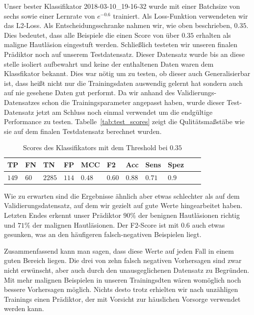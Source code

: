 Unser bester Klassifikator 2018-03-10\_19-16-32 wurde mit einer Batchsize von sechs sowie einer Lernrate von $e^{-0.6}$ trainiert. Als Loss-Funktion verwendeten wir das L2-Loss. Als Entscheidungsschranke nahmen wir, wie oben beschrieben, $0.35$. Dies bedeutet, dass alle Beispiele die einen Score von über $0.35$ erhalten als maligne Hautläsion eingestuft werden. Schließlich testeten wir unseren finalen Prädiktor noch auf unserem Testdatensatz. Dieser Datensatz wurde bis an diese stelle isoliert aufbewahrt und keine der enthaltenen Daten waren dem Klassfikator bekannt. Dies war nötig um zu testen, ob dieser auch Generalisierbar ist, dass heißt nicht nur die Trainingsdaten auswendig gelernt hat sondern auch auf nie gesehene Daten gut performt. Da wir anhand des Validierungs-Datensatzes schon die Trainingsparameter angepasst haben, wurde dieser Test-Datensatz jetzt am Schluss noch einmal verwendet um die endgültige Performance zu testen. Tabelle~\ref{tab:test_scores} zeigt die Qulitätsmaßstäbe wie sie auf dem finalen Testdatensatz berechnet wurden.

\begin{table}[htb!]
\begin{center}
\begin{tabular}{lllllllllll}
	\toprule
 	TP & FN & TN & FP & MCC & F2 & Acc & Sens & Spez\\
	\midrule
    $149$&	$60$ &	$2285$ &	$114$ &	$0.48$ 	&$0.60$	&$0.88$	&$0.71$&	$0.9$ \\
 \bottomrule
 \end{tabular}
 \end{center}
  \caption{Scores des Klassifikators mit dem Threshold bei $0.35$}
 \label{tab:final_scores}
 \end{table}

 Wie zu erwarten sind die Ergebnisse ähnlich aber etwas schlechter als auf dem Validierungsdatensatz, auf dem wir gezielt auf gute Werte hingearbeitet haben. Letzten Endes erkennt unser Prädiktor $90\%$ der benignen Hautläsionen richtig und $71\%$ der malignen Hautläsionen. Der F2-Score ist mit $0.6$ auch etwas gesunken, was an den häufigeren falsch-negativen Beispielen liegt.

 Zusammenfassend kann man sagen, dass diese Werte auf jeden Fall in einem guten Bereich liegen. Die drei von zehn falsch negativen Vorhersagen sind zwar nicht erwünscht, aber auch durch den unausgeglichenen Datensatz zu Begründen. Mit mehr malignen Beispielen in unseren Trainingsdten wären womöglich noch bessere Vorhersagen möglich. Nichts desto trotz erhielten wir nach unzähligen Trainings einen Prädiktor, der mit Vorsicht zur häuslichen Vorsorge verwendet werden kann.


